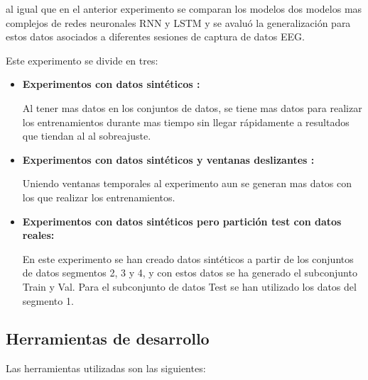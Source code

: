 al igual que en el anterior experimento se comparan los modelos dos modelos mas complejos de redes neuronales RNN y LSTM y se avaluó la generalización para estos datos asociados a diferentes sesiones de captura de datos EEG.

Este experimento se divide en tres:

\begin{itemize}
	
	\item
	\textbf{Experimentos con datos sintéticos :}
	
	Al tener mas datos en los conjuntos de datos, se tiene mas datos para realizar los entrenamientos durante mas tiempo sin llegar rápidamente a resultados que tiendan al al sobreajuste.

	\item
	\textbf{Experimentos con datos sintéticos y ventanas deslizantes :}
	
	Uniendo ventanas temporales al experimento aun se generan mas datos con los que realizar los entrenamientos.
	
		\item
	\textbf{Experimentos con datos sintéticos pero partición test con datos reales:}
	
	En este experimento se han creado datos sintéticos a partir de los conjuntos de datos segmentos 2, 3 y 4, y con estos datos se ha generado el subconjunto Train y Val. Para el subconjunto de datos Test se han utilizado los datos del segmento 1.
	
\end{itemize}	
	
\subsection{Herramientas de desarrollo}


Las herramientas utilizadas son las siguientes:

